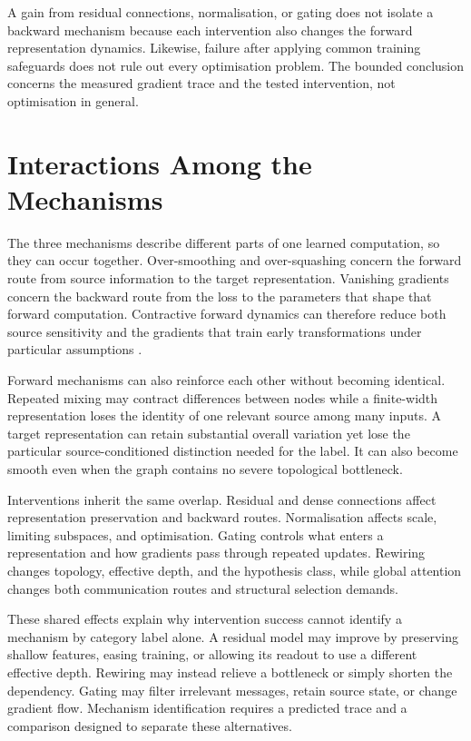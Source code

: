 A gain from residual connections, normalisation, or gating does not isolate a backward mechanism because each intervention also changes the forward representation dynamics.
Likewise, failure after applying common training safeguards does not rule out every optimisation problem.
The bounded conclusion concerns the measured gradient trace and the tested intervention, not optimisation in general.

\section{Interactions Among the Mechanisms}

The three mechanisms describe different parts of one learned computation, so they can occur together.
Over-smoothing and over-squashing concern the forward route from source information to the target representation.
Vanishing gradients concern the backward route from the loss to the parameters that shape that forward computation.
Contractive forward dynamics can therefore reduce both source sensitivity and the gradients that train early transformations under particular assumptions \cite{arroyo2025vanishing}.

Forward mechanisms can also reinforce each other without becoming identical.
Repeated mixing may contract differences between nodes while a finite-width representation loses the identity of one relevant source among many inputs.
A target representation can retain substantial overall variation yet lose the particular source-conditioned distinction needed for the label.
It can also become smooth even when the graph contains no severe topological bottleneck.

Interventions inherit the same overlap.
Residual and dense connections affect representation preservation and backward routes.
Normalisation affects scale, limiting subspaces, and optimisation.
Gating controls what enters a representation and how gradients pass through repeated updates.
Rewiring changes topology, effective depth, and the hypothesis class, while global attention changes both communication routes and structural selection demands.

These shared effects explain why intervention success cannot identify a mechanism by category label alone.
A residual model may improve by preserving shallow features, easing training, or allowing its readout to use a different effective depth.
Rewiring may instead relieve a bottleneck or simply shorten the dependency.
Gating may filter irrelevant messages, retain source state, or change gradient flow.
Mechanism identification requires a predicted trace and a comparison designed to separate these alternatives.


